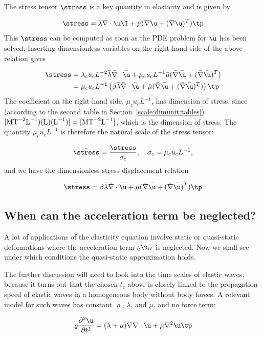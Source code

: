 \documentclass[graybox,envcountchap,sectrefs,final]{svmonodo}
\begin{document}
The stress tensor $\stress$ is a key quantity in elasticity and is given by

\[ \stress = \lambda\nabla\cdot\u\I + \mu(\nabla\u + (\nabla\u)^T)\tp\]
This $\stress$ can be computed as soon as the PDE problem for $\u$
has been solved.
Inserting dimensionless variables on the right-hand side of the above
relation gives

\begin{align*}
\stress &= \lambda_cu_cL^{-2}\bar\lambda\bar\nabla\cdot\bar\u
+ \mu_cu_cL^{-1}\bar\mu(\bar\nabla\bar\u + (\bar\nabla\bar\u)^T)\\ 
&= \mu_c u_cL^{-1}\left(\beta\bar\lambda\bar\nabla\cdot\bar\u +
\bar\mu(\bar\nabla\bar\u + (\bar\nabla\bar\u)^T)\right)\tp
\end{align*}
The coefficient on the right-hand side, $\mu_c u_cL^{-1}$, has dimension
of stress, since (according to the second table in
Section~\ref{scale:dimunit:tables}) $[\hbox{M}\hbox{T}^{-2}\hbox{L}^{-1})(\hbox{L})(\hbox{L}^{-1})]
=[\hbox{M}\hbox{T}^{-2}\hbox{L}^{-1}]$, which is the dimension of stress.
The quantity $\mu_c u_cL^{-1}$ is therefore the natural scale of the
stress tensor:

\[ \bar\stress = \frac{\stress}{\sigma_c},\quad \sigma_c = \mu_c u_c L^{-1},\]
and we have the dimensionless stress-displacement relation

\begin{equation}
\bar\stress =
\beta\bar\lambda\bar\nabla\cdot\bar\u +
\bar\mu(\bar\nabla\bar\u + (\bar\nabla\bar\u)^T)\tp
\end{equation}

\subsection{When can the acceleration term be neglected?}
\label{scale:elasticity:waves}

A lot of applications of the elasticity equation involve static or
quasi-static deformations where the acceleration term
$\varrho\u_{tt}$ is neglected. Now we shall see under which conditions
the quasi-static approximation holds.

The further discussion will need to look into the time scales of
elastic waves, because it turns out that the chosen $t_c$ above is
closely linked to the propagation speed of elastic waves in a
homogeneous body without body forces.  A relevant model for
such waves has constant
$\varrho$, $\lambda$, and $\mu$, and no force term:

\begin{equation}
\varrho\frac{\partial^2\u}{\partial t^2} =
(\lambda + \mu)\nabla \nabla\cdot\u + \mu\nabla^2\u\tp
\label{scale:elasticity:waves:eq}
\end{equation}
\end{document}
